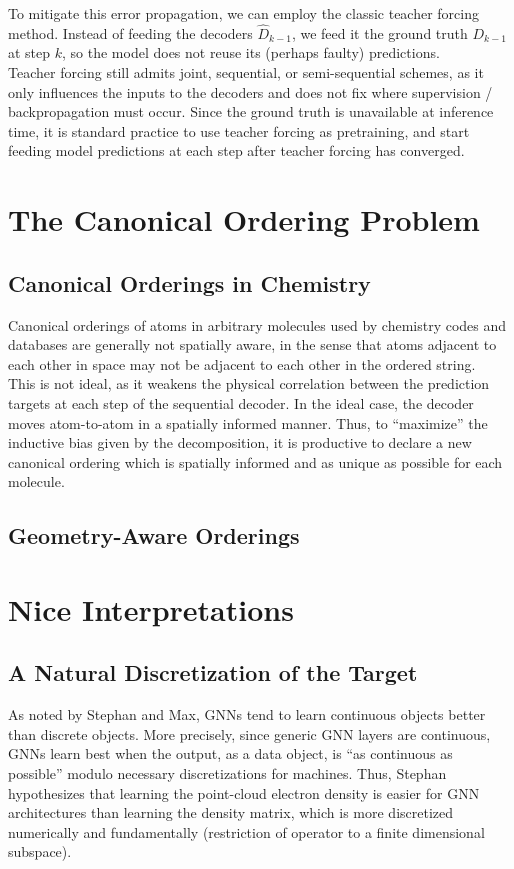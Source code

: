 \documentclass[12pt]{article}
\begin{document}
    To mitigate this error propagation, we can employ the classic teacher forcing method. Instead of feeding the decoders $\hat D_{k-1}$, we feed it the ground truth $D_{k-1}$ at step $k$, so the model does not reuse its (perhaps faulty) predictions. \\[-6pt]
    
    Teacher forcing still admits joint, sequential, or semi-sequential schemes, as it only influences the inputs to the decoders and does not fix where supervision / backpropagation must occur. Since the ground truth is unavailable at inference time, it is standard practice to use teacher forcing as pretraining, and start feeding model predictions at each step after teacher forcing has converged. 

    \section{The Canonical Ordering Problem}

    \subsection{Canonical Orderings in Chemistry}
    Canonical orderings of atoms in arbitrary molecules used by chemistry codes and databases are generally not spatially aware, in the sense that atoms adjacent to each other in space may not be adjacent to each other in the ordered string. \\[-6pt]

    This is not ideal, as it weakens the physical correlation between the prediction targets at each step of the sequential decoder. In the ideal case, the decoder moves atom-to-atom in a spatially informed manner. Thus, to ``maximize'' the inductive bias given by the decomposition, it is productive to declare a new canonical ordering which is spatially informed and as unique as possible for each molecule. 

    \subsection{Geometry-Aware Orderings}

    \section{Nice Interpretations}

    \subsection{A Natural Discretization of the Target}
    As noted by Stephan and Max, GNNs tend to learn continuous objects better than discrete objects. More precisely, since generic GNN layers are continuous, GNNs learn best when the output, as a data object, is ``as continuous as possible'' modulo necessary discretizations for machines. Thus, Stephan hypothesizes that learning the point-cloud electron density is easier for GNN architectures than learning the density matrix, which is more discretized numerically and fundamentally (restriction of operator to a finite dimensional subspace). \\[-6pt]
\end{document}
